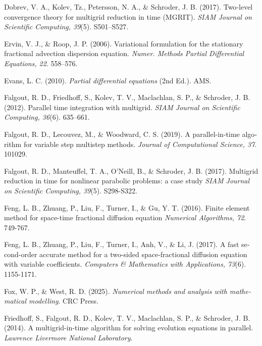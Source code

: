 \begin{latin}
\begin{thebibliography}{99}
Dobrev, V. A., Kolev, Tz.,  Petersson, N. A., \& Schroder, J. B. 
(2017).
Two-level convergence theory for multigrid reduction in time (MGRIT).
\textit{SIAM Journal on Scientific Computing, 39}(5).
S501–S527.

Ervin, V. J., \& Roop, J. P.
(2006).
Variational formulation for the stationary fractional advection dispersion equation.
\textit{Numer. Methods Partial Differential Equations, 22}.
558–576.

Evans, L. C.
(2010).
\textit{Partial differential equations} (2nd Ed.).
AMS.

Falgout, R. D., Friedhoff, S., Kolev, T. V., Maclachlan, S. P., \& Schroder, J. B.
(2012).
Parallel time integration with multigrid.
\textit{SIAM Journal on Scientific Computing, 36}(6).
635–661.

Falgout, R. D., Lecouvez, M., \& Woodward, C. S.
(2019).
A parallel-in-time algorithm for variable step multistep methods.
\textit{Journal of Computational Science, 37}.
101029.

Falgout, R. D., Manteuffel, T. A., O'Neill, B., \& Schroder, J. B.
(2017).
Multigrid reduction in time for nonlinear parabolic problems: a case study
\textit{SIAM Journal on Scientific Computing, 39}(5).
S298-S322.

Feng, L. B., Zhuang, P., Liu, F., Turner, I., \& Gu, Y. T.
(2016).
Finite element method for space-time fractional diffusion equation
\textit{Numerical Algorithms, 72}.
749-767.

Feng, L. B., Zhuang, P., Liu, F., Turner, I., Anh, V., \& Li, J.
(2017).
A fast second-order accurate method for a two-sided space-fractional diffusion equation with variable coefficients.
\textit{Computers \& Mathematics with Applications, 73}(6).
1155-1171.

Fox, W. P., \& West, R. D.
(2025).
\textit{Numerical methods and analysis with mathematical modelling}.
CRC Press.

Friedhoff, S., Falgout, R. D., Kolev, T. V., Maclachlan, S. P., \& Schroder, J. B.
(2014).
A multigrid-in-time algorithm for solving evolution equations in parallel.
\textit{Lawrence Livermore National Laboratory}.


\end{thebibliography}
\end{latin}
